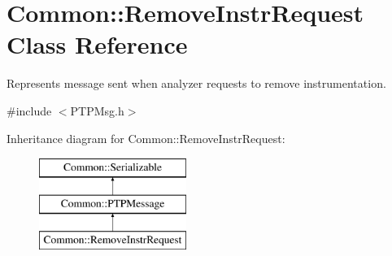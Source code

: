 \hypertarget{class_common_1_1_remove_instr_request}{\section{Common\-:\-:Remove\-Instr\-Request Class Reference}
\label{class_common_1_1_remove_instr_request}
}


Represents message sent when analyzer requests to remove instrumentation.  




{\ttfamily \#include $<$P\-T\-P\-Msg.\-h$>$}

Inheritance diagram for Common\-:\-:Remove\-Instr\-Request\-:\begin{figure}[H]
\begin{center}
\leavevmode
\includegraphics[height=3.000000cm]{class_common_1_1_remove_instr_request}
\end{center}
\end{figure}
